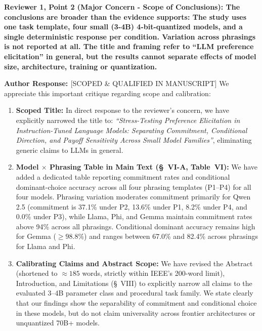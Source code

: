\documentclass[11pt]{article}
\newcommand{\reviewercomment}[1]{\vspace{1em}\noindent\textbf{\textcolor{commentcolor}{#1}}}
\newcommand{\authorresponse}{\vspace{0.5em}\noindent\textbf{\textcolor{responsecolor}{Author Response: }}}
\begin{document}
\reviewercomment{Reviewer 1, Point 2 (Major Concern - Scope of Conclusions): The conclusions are broader than the evidence supports: The study uses one task template, four small (3-4B) 4-bit-quantized models, and a single deterministic response per condition. Variation across phrasings is not reported at all. The title and framing refer to ``LLM preference elicitation'' in general, but the results cannot separate effects of model size, architecture, training or quantization.}

\authorresponse [SCOPED \& QUALIFIED IN MANUSCRIPT] We appreciate this important critique regarding scope and calibration:
\begin{enumerate}[leftmargin=*]
\item \textbf{Scoped Title:} In direct response to the reviewer's concern, we have explicitly narrowed the title to: \textit{``Stress-Testing Preference Elicitation in Instruction-Tuned Language Models: Separating Commitment, Conditional Direction, and Payoff Sensitivity Across Small Model Families''}, eliminating generic claims to LLMs in general.
\item \textbf{Model $\times$ Phrasing Table in Main Text (\S~VI-A, Table~VI):} We have added a dedicated table reporting commitment rates and conditional dominant-choice accuracy across all four phrasing templates (P1--P4) for all four models. Phrasing variation moderates commitment primarily for Qwen 2.5 (commitment is 37.1\% under P2, 13.6\% under P1, 8.2\% under P4, and 0.0\% under P3), while Llama, Phi, and Gemma maintain commitment rates above 94\% across all phrasings. Conditional dominant accuracy remains high for Gemma ($\ge 98.8\%$) and ranges between 67.0\% and 82.4\% across phrasings for Llama and Phi.
\item \textbf{Calibrating Claims and Abstract Scope:} We have revised the Abstract (shortened to $\approx 185$ words, strictly within IEEE's 200-word limit), Introduction, and Limitations (\S~VIII) to explicitly narrow all claims to the evaluated 3--4B parameter class and procedural task family. We state clearly that our findings show the separability of commitment and conditional choice in these models, but do not claim universality across frontier architectures or unquantized 70B+ models.

\end{enumerate}
\end{document}
